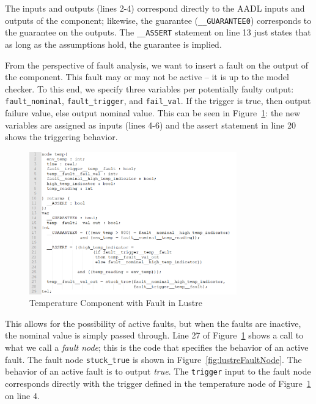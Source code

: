 The inputs and outputs (lines 2-4) correspond directly to the AADL inputs and outputs of the component; likewise, the guarantee (\texttt{\_\_GUARANTEE0}) corresponds to the guarantee on the outputs. The \texttt{\_\_ASSERT} statement on line 13 just states that as long as the assumptions hold, the guarantee is implied. 

From the perspective of fault analysis, we want to insert a fault on the output of the component. This fault may or may not be active -- it is up to the model checker. To this end, we specify three variables per potentially faulty output: \texttt{fault\_nominal}, \texttt{fault\_trigger}, and \texttt{fail\_val}. If the trigger is true, then output failure value, else output nominal value. This can be seen in Figure~\ref{fig:lustreTempNodeFault}: the new variables are assigned as inputs (lines 4-6) and the assert statement in line 20 shows the triggering behavior.

\begin{figure}[h]
	\begin{center}
		\includegraphics[width=0.8\textwidth]{images/lustreTempNodeFault.png}
	\end{center}
	\caption{Temperature Component with Fault in Lustre}
	\label{fig:lustreTempNodeFault}
\end{figure}

This allows for the possibility of active faults, but when the faults are inactive, the nominal value is simply passed through. Line 27 of Figure~\ref{fig:lustreTempNodeFault} shows a call to what we call a {\em fault node}; this is the code that specifies the behavior of an active fault. The fault node \texttt{stuck\_true} is shown in Figure~\ref{fig:lustreFaultNode}. The behavior of an active fault is to output {\em true}. The \texttt{trigger} input to the fault node corresponds directly with the trigger defined in the temperature node of Figure~\ref{fig:lustreTempNodeFault} on line 4. 

